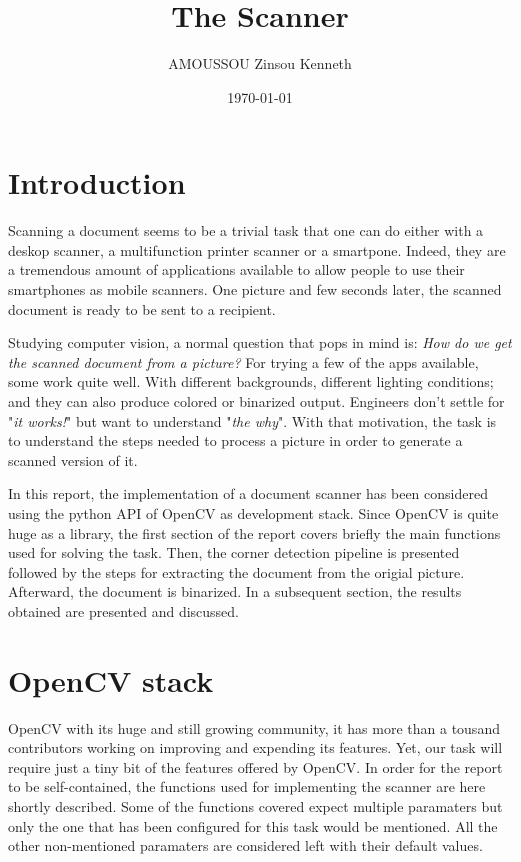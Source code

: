 \documentclass{scrartcl}
\title{The Scanner}
\author{AMOUSSOU Zinsou Kenneth}
\date{\today}
\begin{document}
	\maketitle
	\tableofcontents

	\clearpage

  \section{Introduction}

  Scanning a document seems to be a trivial task that one can do either with a
  deskop scanner, a multifunction printer scanner or a smartpone. Indeed, they are
  a tremendous amount of applications available to allow people to use their smartphones
  as mobile scanners. One picture and few seconds later, the scanned document is ready to
  be sent to a recipient.

  Studying computer vision, a normal question that pops in mind is:
  \textit{How do we get the scanned document from a picture?}
  For trying a few of the apps available, some work quite well. With different backgrounds,
  different lighting conditions; and they can also produce colored or binarized output.
  Engineers don't settle for "\textit{it works!}" but want to understand "\textit{the why}". With
  that motivation, the task is to understand the steps needed to process a picture in order to
  generate a scanned version of it.

  In this report, the implementation of a document scanner has been considered using the python API
  of OpenCV as development stack. Since OpenCV is quite huge as a library, the first section of the
  report covers briefly the main functions used for solving the task. Then, the corner detection
  pipeline is presented followed by the steps for extracting the document from the origial picture.
  Afterward, the document is binarized. In a subsequent section, the results obtained are
  presented and discussed.

  \section{OpenCV stack}
  \label{opencv-stack}

  OpenCV with its huge and still growing community, it has more than a tousand contributors working
  on improving and expending its features. Yet, our task will require just a tiny bit of the features
  offered by OpenCV. In order for the report to be self-contained, the functions used for implementing
  the scanner are here shortly described. Some of the functions covered expect multiple paramaters but
  only the one that has been configured for this task would be mentioned. All the other non-mentioned
  paramaters are considered left with their default values.
\end{document}
